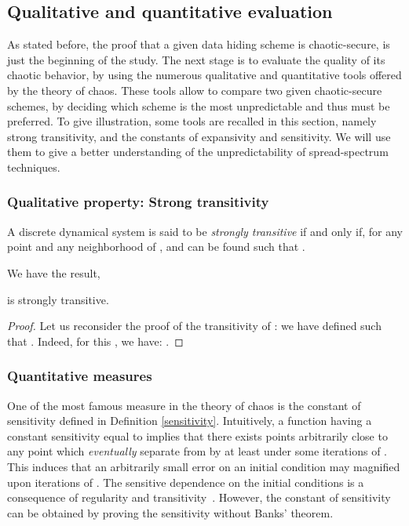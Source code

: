 \documentclass{llncs}
\begin{document}
\subsection{Qualitative and quantitative evaluation}

As stated before, the proof that a given data hiding scheme is chaotic-secure, is just the beginning of the study. The next stage is to evaluate the quality of its chaotic behavior, by using the numerous qualitative and quantitative tools offered by the theory of chaos. These tools allow to compare two given chaotic-secure schemes, by deciding which scheme is the most unpredictable and thus must be preferred. To give illustration, some tools are recalled in this section, namely strong transitivity, and the constants of expansivity and sensitivity. We will use them to give a better understanding of the unpredictability of spread-spectrum techniques. 

\subsubsection{Qualitative property: Strong transitivity}


\begin{definition}
A discrete dynamical system  is said to be \emph{strongly transitive} if and only if, for any point  and any neighborhood  of ,  and  can be found such that .
\end{definition}

We have the result,

\begin{proposition}
 is strongly transitive.
\end{proposition}


\begin{proof}
Let us reconsider the proof of the transitivity of : we have defined  such that . Indeed, for this , we have: .
\end{proof}




\subsubsection{Quantitative measures}
\label{QUANTITATIVE MEASURE}


\label{par:Sensitivity}
One of the most famous measure in the theory of chaos is the constant of sensitivity defined in Definition \ref{sensitivity}. Intuitively, a function  having a constant  sensitivity equal to  implies that there exists points arbitrarily close to any point  which \emph{eventually} separate from  by at least  under some iterations of . This induces that an arbitrarily small error on an initial condition may magnified upon iterations of . The sensitive dependence on the initial conditions is a consequence of regularity and transitivity~\cite{Banks92}. However, the constant of sensitivity can be obtained by proving the sensitivity without Banks' theorem.
\end{document}

